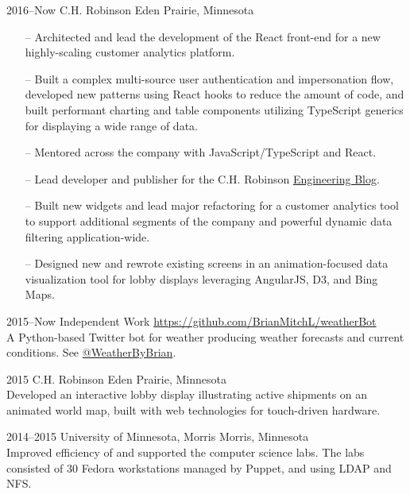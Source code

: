 \documentclass[]{cv-style} %
\begin{document}
\begin{entrylist}

\entry
{2016--Now}
{C.H. Robinson}
{Eden Prairie, Minnesota}
{
\begin{itemize}
    \item[--] Architected and lead the development of the React front-end for a new highly-scaling customer analytics platform.
    \item[--] Built a complex multi-source user authentication and impersonation flow, developed new patterns using React hooks to reduce the amount of code, and built performant charting and table components utilizing TypeScript generics for displaying a wide range of data.
    \item[--] Mentored across the company with JavaScript/TypeScript and React.
    \item[--] Lead developer and publisher for the C.H. Robinson \href{https://engineering.chrobinson.com}{Engineering Blog}.
\end{itemize}
\begin{itemize}
    \item[--] Built new widgets and lead major refactoring for a customer analytics tool to support additional segments of the company and powerful dynamic data filtering application-wide.
    \item[--] Designed new and rewrote existing screens in an animation-focused data visualization tool for lobby displays leveraging AngularJS, D3, and Bing Maps.
\end{itemize}}


\entry
{2015--Now}
{Independent Work}
{\href{https://github.com/BrianMitchL/weatherBot}{https://github.com/BrianMitchL/weatherBot}}
{ \\
A Python-based Twitter bot for weather producing weather forecasts and current conditions. See \href{https://twitter.com/WeatherByBrian}{@WeatherByBrian}.}


\entry
{2015}
{C.H. Robinson}
{Eden Prairie, Minnesota}
{ \\
Developed an interactive lobby display illustrating active shipments on an animated world map, built with web technologies for touch-driven hardware.}


\entry
{2014--2015}
{University of Minnesota, Morris}
{Morris, Minnesota}
{ \\
Improved efficiency of and supported the computer science labs. The labs consisted of 30 Fedora workstations managed by Puppet, and using LDAP and NFS.}


\end{entrylist}
\end{document}
